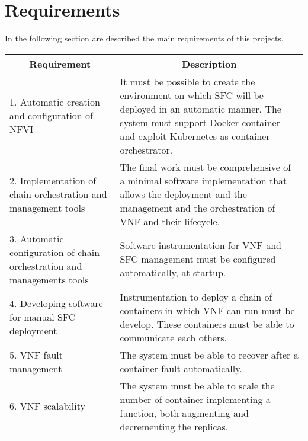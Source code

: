 \section{Requirements}\label{chap:prjan:sec:req}
In the following section are described the main requirements of this projects.

\begin{longtable}[c]{p{}p{}}
\hline
\multicolumn{1}{c}{\textbf{Requirement}}                                & \multicolumn{1}{c}{\textbf{Description}}                                                                                                                                                       \\ \hline
\endhead
%
\hline
\endfoot
%
\endlastfoot
%
1. Automatic creation and configuration of NFVI                         & It must be possible to create the environment on which SFC will be deployed in an automatic manner. The system must support Docker container and exploit Kubernetes as container orchestrator. \\
2. Implementation of chain orchestration and management tools           & The final work must be comprehensive of a minimal software implementation that allows the deployment and the management and the orchestration of VNF and their lifecycle.                      \\
3. Automatic configuration of chain orchestration and managements tools & Software instrumentation for VNF and SFC management must be configured automatically, at startup.                                                                                              \\
4. Developing software for manual SFC deployment                        & Instrumentation to deploy a chain of containers in which VNF can run must be develop. These containers must be able to communicate each others.                                                \\
5. VNF fault management                                                 & The system must be able to recover after a container fault automatically.                                                                                                                      \\
6. VNF scalability                                                      & The system must be able to scale the number of container implementing a function, both augmenting and decrementing the replicas.                                                               \\

\end{longtable}
